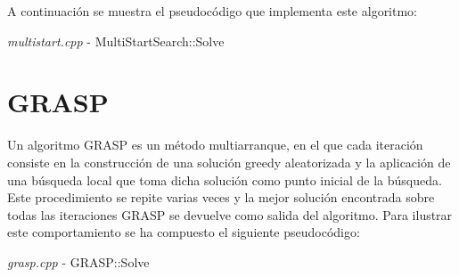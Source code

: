 \documentclass[a4paper, 12pt]{article}
\begin{document}
     	A continuación se muestra el pseudocódigo que implementa este algoritmo:\\
     	\begin{algorithm}[H]
       	\caption{\textit{multistart.cpp} - MultiStartSearch::Solve}
       	
      \end{algorithm}
     	
     	
     	\newpage
     	\section{GRASP}
     	Un algoritmo GRASP es un método multiarranque, en el que cada iteración consiste en la construcción de una solución greedy aleatorizada y la aplicación de una búsqueda local que toma dicha solución como punto inicial de la búsqueda.\\
     	
     	Este procedimiento se repite varias veces y la mejor solución encontrada sobre todas las iteraciones GRASP se devuelve como salida del algoritmo. Para ilustrar este comportamiento se ha compuesto el siguiente pseudocódigo:\\
     	\begin{algorithm}[H]
       	\caption{\textit{grasp.cpp} - GRASP::Solve}
       	
      \end{algorithm}
     	
\end{document}
